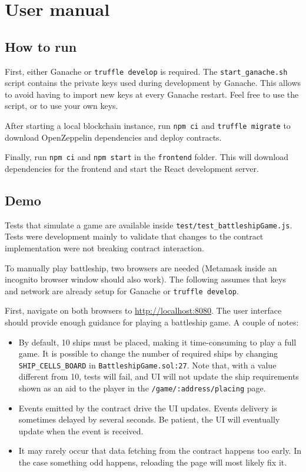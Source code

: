 \section{User manual}
\subsection{How to run}
First, either Ganache or \texttt{truffle develop} is required. The
\texttt{start_ganache.sh} script contains the private keys used
during development by Ganache. This allows to avoid having to import new keys
at every Ganache restart. Feel free to use the script, or to use your own keys.

After starting a local blockchain instance, run \texttt{npm ci} and
\texttt{truffle migrate} to download OpenZeppelin dependencies and
deploy contracts.

Finally, run \texttt{npm ci} and \texttt{npm start} in the
\texttt{frontend} folder. This will download dependencies for the
frontend and start the React development server.

\subsection{Demo}
Tests that simulate a game are available inside
\texttt{test/test_battleshipGame.js}. Tests were development mainly
to validate that changes to the contract implementation were not breaking
contract interaction.

To manually play battleship, two browsers are needed (Metamask inside an
incognito browser window should also work). The following assumes that keys and
network are already setup for Ganache or \texttt{truffle develop}.

First, navigate on both browsers to
\href{http://localhost:8080}{\color{blue}http://localhost:8080}. The user
interface should provide enough guidance for playing a battleship game. A
couple of notes:
\begin{itemize}
	\item By default, 10 ships must be placed, making it time-consuming to play a full
	      game. It is possible to change the number of required ships by changing
	      \texttt{SHIP_CELLS_BOARD} in
	      \texttt{BattleshipGame.sol:27}. Note that, with a value different
	      from 10, tests will fail, and UI will not update the ship requirements shown as
	      an aid to the player in the \texttt{/game/:address/placing} page.
	\item Events emitted by the contract drive the UI updates. Events delivery is
	      sometimes delayed by several seconds. Be patient, the UI will eventually update
	      when the event is received.
	\item It may rarely occur that data fetching from the contract happens too early. In
	      the case something odd happens, reloading the page will most likely fix it.
\end{itemize}

